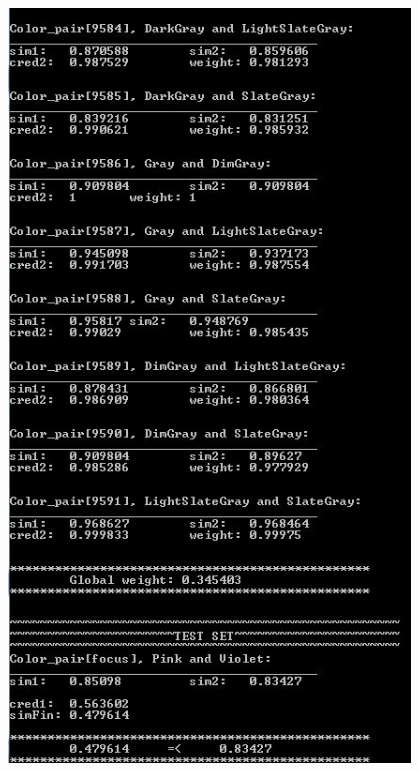 \documentclass[egilmezThesis.tex]{subfiles}
\begin{document}
\newpage
\begin{center}
\label{The minimum rule is utilized}
\includegraphics[width=0.8\textwidth]{2.jpg}
\end{center}
\end{document}
